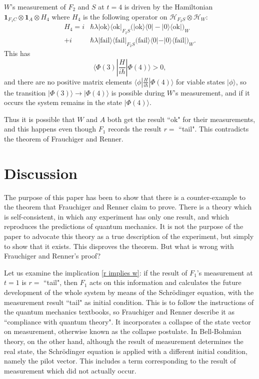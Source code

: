 \documentclass[12pt,a4paper,reqno]{article}
\newcommand{\ok}{\text{ok}}
\newcommand{\fail}{\text{fail}}
\renewcommand{\(}{\left(}
\renewcommand{\)}{\right)}
\renewcommand{\.}{\centerdot}
\newcommand{\1}{\mathbf{1}}
\renewcommand{\H}{\mathcal{H}}
\newcommand{\ox}{\otimes}
\newcommand{\<}{\langle}
\renewcommand{\>}{\rangle}
\theoremstyle{definition}
\theoremstyle{remark}
\numberwithin{equation}{section}
\begin{document}
$W$'s measurement of $F_2$ and $S$ at $t = 4$ is driven by the Hamiltonian $\1_{F_1C}\ox\1_A\ox H_4$ where $H_4$ is the following operator on $\H_{F_2S}\ox\H_W$:
\begin{align*}
H_4 = i&\hbar\lambda|\ok\>\<\ok|_{F_2S}\big(|\ok\>\<0|-|0\>\<\ok|\big)_W\\
+i&\hbar\lambda|\fail\>\<\fail|_{F_2S}\big(\fail\>\<0| - |0\>\<\fail|\big)_W.
\end{align*}
This has
\[
\<\Phi(3)|\frac{H}{i\hbar}|\Phi(4)\> > 0,
\]
and there are no positive matrix elements $\<\phi|\tfrac{H}{i\hbar}|\Phi(4)\>$ for viable states $|\phi\>$, so the transition $|\Phi(3)\> \rightarrow |\Phi(4)\>$ is possible during $W$'s measurement, and if it occurs the system remains in the state $|\Phi(4)\>$. 

Thus it is possible that $W$ and $A$ both get the result ``ok" for their measurements, and this happens even though $F_1$ records the result $r =$ ``tail". This contradicts the theorem of Frauchiger and Renner.

\section{Discussion}

The purpose of this paper has been to show that there is a counter-example to the theorem that Frauchiger and Renner claim to prove. There is a theory which is self-consistent, in which any experiment has only one result, and which reproduces the predictions of quantum mechanics. It is not the purpose of the paper to advocate this theory as a true description of the experiment, but simply to show that it exists. This disproves the theorem. But what is wrong with Frauchiger and Renner's proof?

Let us examine the implication \eqref{r implies w}: if the result of $F_1$'s measurement at $t = 1$ is $r = $ ``tail", then $F_1$ acts on this information and calculates the future development of the whole system by means of the Schr\"odinger equation, with the measurement result ``tail" as initial condition. This is to follow the instructions of the quantum mechanics textbooks, so Frauchiger and Renner describe it as ``compliance with quantum theory". It incorporates a collapse of the state vector on measurement, otherwise known as the collapse postulate. In Bell-Bohmian theory, on the other hand, although the result of measurement determines the real state, the Schr\"odinger equation is applied with a different initial condition, namely the pilot vector. This includes a term corresponding to the result of measurement which did not actually occur. 
\end{document}

